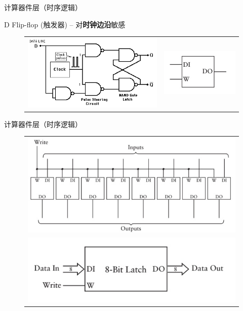 \documentclass{myslide}
\begin{document}
\begin{frame}{计算器件层（时序逻辑）}
\begin{center}
\large D Flip-flop (触发器) -- 对\textbf{时钟边沿}敏感
\end{center}
\begin{figure}
\centering
\begin{tabular}{cc}
\includegraphics[width=0.6\linewidth]{fig/Lecture2/d-ff.png}&
\includegraphics[width=0.3\linewidth]{fig/Lecture2/d-ff_2.jpg}
\end{tabular}
\end{figure}
\end{frame}

\begin{frame}{计算器件层（时序逻辑）}
\begin{figure}
\centering
\begin{tabular}{c}
\includegraphics[width=0.8\linewidth]{fig/Lecture2/8bit-latch.jpg}\\
\includegraphics[width=0.6\linewidth]{fig/Lecture2/8bit-latch_2.jpg}
\end{tabular}
\end{figure}
\end{frame}
\end{document}
